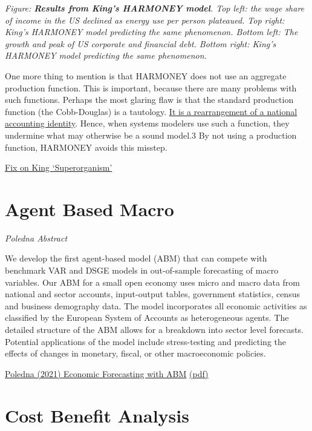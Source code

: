 \documentclass[
]{book}
\begin{document}
\emph{Figure: \textbf{Results from King's HARMONEY model}. Top left: the wage share of income in the US declined as energy use per person plateaued. Top right: King's HARMONEY model predicting the same phenomenon. Bottom left: The growth and peak of US corporate and financial debt. Bottom right: King's HARMONEY model predicting the same phenomenon.}

One more thing to mention is that HARMONEY does not use an aggregate production function. This is important, because there are many problems with such functions. Perhaps the most glaring flaw is that the standard production function (the Cobb-Douglas) is a tautology. \href{https://economicsfromthetopdown.com/2020/06/10/economic-growth-theory-bah-humbug/}{It is a rearrangement of a national accounting identity}. Hence, when systems modelers use such a function, they undermine what may otherwise be a sound model.3 By not using a production function, HARMONEY avoids this misstep.

\href{https://economicsfromthetopdown.com/2021/03/05/a-review-of-carey-kings-the-economic-superorganism/}{Fix on King `Superorganism'}

\hypertarget{agent-based-macro}{%
\chapter{Agent Based Macro}\label{agent-based-macro}}

\emph{Poledna Abstract}

We develop the first agent-based model (ABM) that can compete with benchmark VAR and DSGE models in
out-of-sample forecasting of macro variables. Our ABM for a small open economy uses micro and macro data
from national and sector accounts, input-output tables, government statistics, census and business demography
data. The model incorporates all economic activities as classified by the European System of Accounts as
heterogeneous agents. The detailed structure of the ABM allows for a breakdown into sector level forecasts.
Potential applications of the model include stress-testing and predicting the effects of changes in monetary,
fiscal, or other macroeconomic policies.

\href{https://www.rebuildingmacroeconomics.ac.uk/research-prize-complexity-macro}{Poledna (2021) Economic Forecasting with ABM}
\href{pdf/Poledna_2021_Economic_Forecasting_ABM.pdf}{(pdf)}

\hypertarget{cost-benefit-analysis}{%
\chapter{Cost Benefit Analysis}\label{cost-benefit-analysis}}
\end{document}
